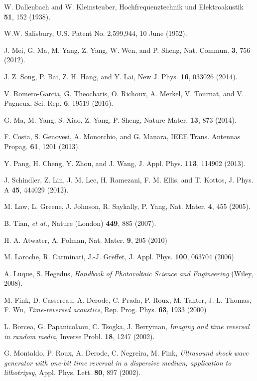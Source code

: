 \documentclass[aps,prl,twocolumn,showpacs,groupedaddress,amsmath,amssymb]{revtex4}
\begin{document}
\begin{thebibliography}{1}
W. Dallenbach and W. Kleinsteuber, Hochfrequenztechnik und Elektroakustik {\bf 51}, 152 (1938).

 W.W. Salisbury, U.S. Patent No. 2,599,944, 10 June (1952).

J. Mei, G. Ma, M. Yang, Z. Yang, W. Wen, and P. Sheng, Nat. Commun. {\bf 3}, 756 (2012).

 J. Z. Song, P. Bai, Z. H. Hang, and Y. Lai, New J. Phys. {\bf 16}, 033026 (2014).

 V. Romero-Garcia, G. Theocharis, O. Richoux, A. Merkel, V. Tournat, and V. Pagneux, Sci. Rep. {\bf 6}, 19519 (2016).

G. Ma, M. Yang, S. Xiao, Z. Yang, P. Sheng, Nature Mater. {\bf 13}, 873 (2014).

 F. Costa, S. Genovesi, A. Monorchio, and G. Manara, IEEE Trans. Antennas Propag. {\bf 61}, 1201 (2013).

 Y. Pang, H. Cheng, Y. Zhou, and J. Wang, J. Appl. Phys. {\bf 113}, 114902 (2013).

 J. Schindler, Z. Lin, J. M. Lee, H. Ramezani, F. M. Ellis, and T. Kottos, J. Phys. A {\bf 45}, 444029 (2012).

 M. Law, L. Greene, J. Johnson, R. Saykally, P. Yang, Nat. Mater. {\bf 4}, 455 (2005).

B. Tian, {\it et al.}, Nature (London) {\bf 449}, 885 (2007).

H. A. Atwater, A. Polman, Nat. Mater. {\bf 9}, 205 (2010)

M. Laroche, R. Carminati, J.-J. Greffet, J. Appl. Phys. {\bf 100}, 063704 (2006)

A. Luque, S. Hegedus, {\it Handbook of Photovoltaic Science and Engineering} (Wiley, 2008).

M. Fink, D. Cassereau, A. Derode, C. Prada, P. Roux, M. Tanter, J.-L. Thomas, F. Wu, {\it Time-reversed acoustics}, 
Rep. Prog. Phys. {\bf 63}, 1933 (2000)

L. Borcea, G. Papanicolaou, C. Tsogka, J. Berryman, {\it Imaging and time reversal in random media}, Inverse Probl. {\bf 18}, 1247 (2002).

G. Montaldo, P. Roux, A. Derode, C. Negreira, M. Fink, {\it Ultrasound shock wave generator with one-bit time reversal in a 
dispersive medium, application to lithotripsy}, Appl. Phys. Lett. {\bf 80}, 897 (2002).


\end{thebibliography}
\end{document}
